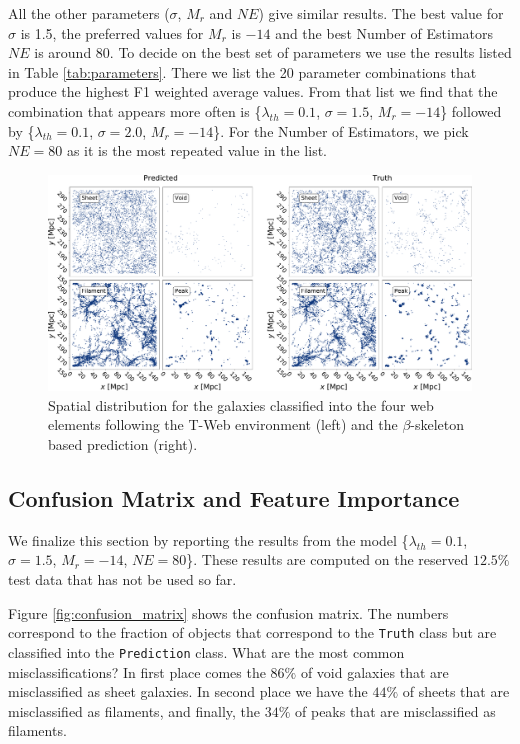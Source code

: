\documentclass[usenatbib]{mnras}
\begin{document}
All the other parameters ($\sigma$, $M_r$ and $NE$) give similar results. 
The best value for $\sigma$ is 1.5, the preferred values
for $M_r$ is $-14$ and the best Number of
Estimators $NE$ is around $80$.
To decide on the best set of parameters we use the results listed in
Table \ref{tab:parameters}.
There we list the 20 parameter combinations that
produce the highest F1 weighted average values.
From that list we find that the combination that appears more often is 
\{$\lambda_{th}=0.1$, $\sigma=1.5$, $M_r=-14$\} followed by 
\{$\lambda_{th}=0.1$, $\sigma=2.0$, $M_r=-14$\}.
For the Number of Estimators, we pick $NE=80$ as it is the most repeated value in the list.

\begin{figure}
  \centering 
    \includegraphics[scale=0.28]{Figs/p_environment_predicted.pdf}
    \caption{Spatial distribution for the galaxies classified into the
      four web elements following the T-Web environment (left) and 
      the $\beta$-skeleton based prediction (right).} 
    \label{fig:prediction}
\end{figure}


\subsection{Confusion Matrix and Feature Importance}

We finalize this section by reporting the results from the model 
\{$\lambda_{th}=0.1$, $\sigma=1.5$, $M_r=-14$, $NE=80$\}.
These results are computed on the reserved $12.5\%$ test data that has not be used so far.

Figure \ref{fig:confusion_matrix} shows the confusion matrix.
The numbers correspond to the fraction of objects that correspond to
the \verb"Truth" class but are classified into the \verb"Prediction"
class.
What are the most common misclassifications?
In first place comes the $86\%$ of void galaxies that are misclassified
as sheet galaxies.  
In second place we have the $44\%$ of sheets that are misclassified
as filaments, and finally, the $34\%$ of peaks that are misclassified as filaments.
\end{document}
